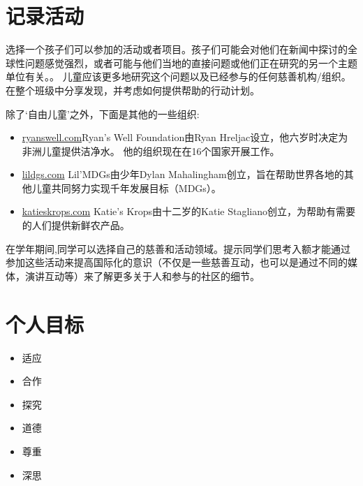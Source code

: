 \section{记录活动}
     选择一个孩子们可以参加的活动或者项目。孩子们可能会对他们在新闻中探讨的全球性问题感觉强烈，或者可能与他们当地的直接问题或他们正在研究的另一个主题单位有关。。 儿童应该更多地研究这个问题以及已经参与的任何慈善机构/组织。 在整个班级中分享发现，并考虑如何提供帮助的行动计划。\par
     除了‘自由儿童’之外，下面是其他的一些组织:\par
     \begin{itemize}
        \item \href{http://www.ryanswell.ca/}{ryanswell.com}Ryan's Well Foundation由Ryan Hreljac设立，他六岁时决定为非洲儿童提供洁净水。 他的组织现在在16个国家开展工作。
        \item \href{http://www.lilmdgs.org/}{lildgs.com} Lil'MDGs由少年Dylan Mahalingham创立，旨在帮助世界各地的其他儿童共同努力实现千年发展目标（MDGs）。
        \item \href{http://katieskrops.com/home.html}{katieskrops.com} Katie's Krops由十二岁的Katie Stagliano创立，为帮助有需要的人们提供新鲜农产品。
     \end{itemize}  
     在学年期间,同学可以选择自己的慈善和活动领域。提示同学们思考入额才能通过参加这些活动来提高国际化的意识（不仅是一些慈善互动，也可以是通过不同的媒体，演讲互动等）来了解更多关于人和参与的社区的细节。
     
\section{个人目标}
    \begin{itemize}
      \item 适应
      \item 合作
      \item 探究
      \item 道德
      \item 尊重
      \item 深思 
    \end{itemize}  
